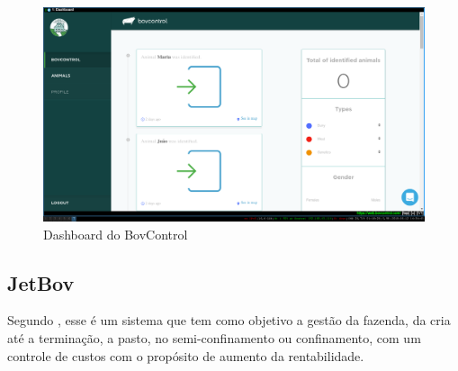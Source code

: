 \documentclass[12pt]{article}
\begin{document}
\begin{figure}[!h]
	\begin{center}
		\caption{Dashboard do BovControl}
		\includegraphics[width=6in]{img/bovcontrol.png}

	\end{center}
\end{figure}






\newpage


\subsection{JetBov}

Segundo , esse é um sistema que tem como objetivo a gestão da fazenda, da cria até a terminação, a pasto, no semi-confinamento ou confinamento, com um controle de custos com o propósito de aumento da rentabilidade. 
\end{document}
